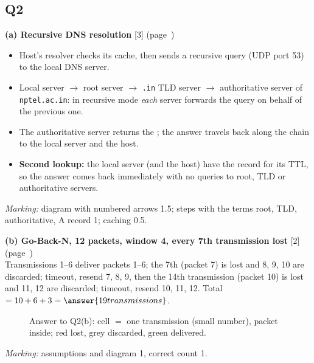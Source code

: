 \subsection*{Q2}
\textbf{(a) Recursive DNS resolution} [3] \hfill (page~\pageref{iq:C18})
\begin{itemize}
\item Host's resolver checks its cache, then sends a recursive query (UDP port 53) to the local DNS server.
\item Local server $\to$ root server $\to$ \texttt{.in} TLD server $\to$ authoritative server of \texttt{nptel.ac.in}: in recursive mode \emph{each} server forwards the query on behalf of the previous one.
\item The authoritative server returns the ; the answer travels back along the chain to the local server and the host.
\item \textbf{Second lookup:} the local server (and the host) have  the record for its TTL, so the answer comes back immediately with no queries to root, TLD or authoritative servers.
\end{itemize}
\textit{Marking:} diagram with numbered arrows 1.5; steps with the terms root, TLD, authoritative, A record 1; caching 0.5.

\textbf{(b) Go-Back-N, 12 packets, window 4, every 7th transmission lost} [2] \hfill (page~\pageref{iq:C25})\\
Transmissions 1--6 deliver packets 1--6; the 7th (packet 7) is lost and 8, 9, 10 are discarded; timeout, resend 7, 8, 9, then the 14th transmission (packet 10) is lost and 11, 12 are discarded; timeout, resend 10, 11, 12. Total $=10+6+3=\answer{19 transmissions}$.
\begin{figure}[H]\centering
{}
\caption{Answer to Q2(b): cell $=$ one transmission (small number), packet inside; red lost, grey discarded, green delivered.}\end{figure}
\textit{Marking:} assumptions and diagram 1, correct count 1.

